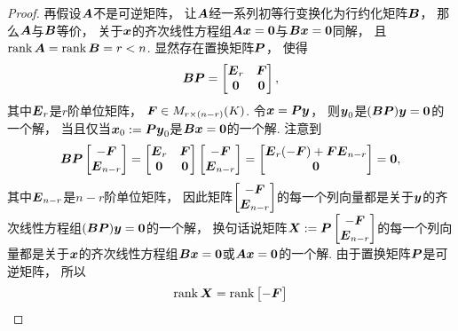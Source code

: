 \begin{theorem}
\begin{proof}
再假设\(\boldsymbol{A}\)不是可逆矩阵，
让\(\boldsymbol{A}\)经一系列初等行变换化为行约化矩阵\(\boldsymbol{B}\)，
那么\(\boldsymbol{A}\)与\(\boldsymbol{B}\)等价，
关于\(\boldsymbol{x}\)的齐次线性方程组\(\boldsymbol{A} \boldsymbol{x} = \boldsymbol0\)与\(\boldsymbol{B} \boldsymbol{x} = \boldsymbol0\)同解，
且\(\rank\boldsymbol{A} = \rank\boldsymbol{B} = r < n\).
显然存在置换矩阵\(\boldsymbol{P}\)，
使得\begin{equation*}
	\boldsymbol{B} \boldsymbol{P}
	= \begin{bmatrix}
		\boldsymbol{E}_r & \boldsymbol{F} \\
		\boldsymbol0 & \boldsymbol0
	\end{bmatrix},
\end{equation*}
其中\(\boldsymbol{E}_r\)是\(r\)阶单位矩阵，
\(\boldsymbol{F} \in M_{r\times(n-r)}(K)\).
令\(\boldsymbol{x} = \boldsymbol{P} \boldsymbol{y}\)，
则\(\boldsymbol{y}_0\)是\((\boldsymbol{B} \boldsymbol{P}) \boldsymbol{y} = \boldsymbol0\)的一个解，
当且仅当\(\boldsymbol{x}_0 := \boldsymbol{P} \boldsymbol{y}_0\)是\(\boldsymbol{B} \boldsymbol{x} = \boldsymbol0\)的一个解.
注意到\begin{equation*}
	\boldsymbol{B} \boldsymbol{P}
	\begin{bmatrix}
		-\boldsymbol{F} \\
		\boldsymbol{E}_{n-r}
	\end{bmatrix}
	= \begin{bmatrix}
		\boldsymbol{E}_r & \boldsymbol{F} \\
		\boldsymbol0 & \boldsymbol0
	\end{bmatrix}
	\begin{bmatrix}
		-\boldsymbol{F} \\
		\boldsymbol{E}_{n-r}
	\end{bmatrix}
	= \begin{bmatrix}
		\boldsymbol{E}_r (-\boldsymbol{F}) + \boldsymbol{F} \boldsymbol{E}_{n-r} \\
		\boldsymbol0
	\end{bmatrix}
	= \boldsymbol0,
\end{equation*}
其中\(\boldsymbol{E}_{n-r}\)是\(n-r\)阶单位矩阵，
因此矩阵\(
	\begin{bmatrix}
		-\boldsymbol{F} \\
		\boldsymbol{E}_{n-r}
	\end{bmatrix}
\)的每一个列向量都是关于\(\boldsymbol{y}\)的齐次线性方程组\((\boldsymbol{B} \boldsymbol{P}) \boldsymbol{y} = \boldsymbol0\)的一个解，
换句话说矩阵\(
	\boldsymbol{X}
	:=
	\boldsymbol{P}
	\begin{bmatrix}
		-\boldsymbol{F} \\
		\boldsymbol{E}_{n-r}
	\end{bmatrix}
\)的每一个列向量都是关于\(\boldsymbol{x}\)的齐次线性方程组\(\boldsymbol{B} \boldsymbol{x} = \boldsymbol0\)或\(\boldsymbol{A} \boldsymbol{x} = \boldsymbol0\)的一个解.
由于置换矩阵\(\boldsymbol{P}\)是可逆矩阵，
所以\begin{equation*}
	\rank\boldsymbol{X}
	= \rank\begin{bmatrix}
		-\boldsymbol{F} \\

\end{bmatrix}
\end{equation*}
\end{proof}
\end{theorem}

